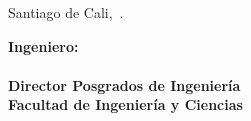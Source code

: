 {    %



    \thispagestyle{empty}
    \noindent Santiago de Cali,~\fecha.

    \vspace{1.5cm}
    \noindent \textbf{Ingeniero:}\\
    \textbf{\directorIE}\\
    \noindent \textbf{Director Posgrados de Ingeniería} \\
    \textbf{Facultad de Ingenier\'ia y Ciencias} \\

}
